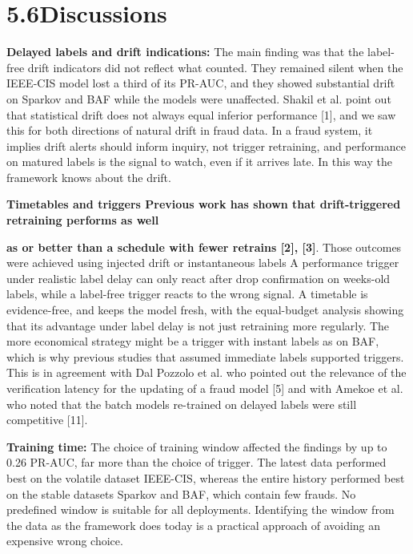 \documentclass[11pt,letterpaper]{report}
\begin{document}
\section*{5.6\quad Discussions}

\textbf{Delayed labels and drift indications:} The main finding was that the label-free drift indicators did not reflect what counted. They remained silent when the IEEE-CIS model lost a third of its PR-AUC, and they showed substantial drift on Sparkov and BAF while the models were unaffected. Shakil et al. point out that statistical drift does not always equal inferior performance [1], and we saw this for both directions of natural drift in fraud data. In a fraud system, it implies drift alerts should inform inquiry, not trigger retraining, and performance on matured labels is the signal to watch, even if it arrives late. In this way the framework knows about the drift.

\noindent\textbf{Timetables and triggers Previous work has shown that drift-triggered retraining performs as well}

\textbf{as or better than a schedule with fewer retrains [2], [3]}. Those outcomes were achieved using injected drift or instantaneous labels A performance trigger under realistic label delay can only react after drop confirmation on weeks-old labels, while a label-free trigger reacts to the wrong signal. A timetable is evidence-free, and keeps the model fresh, with the equal-budget analysis showing that its advantage under label delay is not just retraining more regularly. The more economical strategy might be a trigger with instant labels as on BAF, which is why previous studies that assumed immediate labels supported triggers. This is in agreement with Dal Pozzolo et al. who pointed out the relevance of the verification latency for the updating of a fraud model [5] and with Amekoe et al. who noted that the batch models re-trained on delayed labels were still competitive [11].

\textbf{Training time:} The choice of training window affected the findings by up to 0.26 PR-AUC, far more than the choice of trigger. The latest data performed best on the volatile dataset IEEE-CIS, whereas the entire history performed best on the stable datasets Sparkov and BAF, which contain few frauds. No predefined window is suitable for all deployments. Identifying the window from the data as the framework does today is a practical approach of avoiding an expensive wrong choice.
\end{document}
